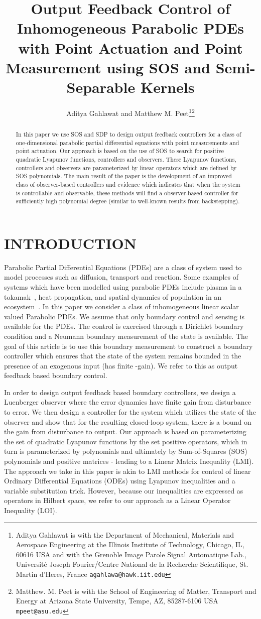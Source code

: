 \documentclass[US letter, 9 pt, conference]{ieeeconf}  \usepackage{setspace}
\title{\LARGE \bf
Output Feedback Control of Inhomogeneous Parabolic PDEs with Point Actuation and Point Measurement using SOS and Semi-Separable Kernels
}
\author{Aditya Gahlawat and Matthew M. Peet\thanks{Aditya Gahlawat is with the Department
of Mechanical, Materials and Aerospace Engineering at the Illinois Institute of Technology, Chicago,
IL, 60616 USA and with the Grenoble Image Parole Signal Automatique Lab., Universit\'{e} Joseph Fourier/Centre National de la Recherche Scientifique, St. Martin d'Heres, France
        {\tt\small agahlawa@hawk.iit.edu}}\thanks{Matthew. M. Peet is with the School of Engineering of Matter, Transport and Energy at Arizona State University, Tempe, AZ, 85287-6106 USA
        {\tt\small mpeet@asu.edu}}}
\begin{document}
\maketitle
\thispagestyle{empty}
\pagestyle{empty}


\begin{abstract}
In this paper we use SOS and SDP to design output feedback controllers for a class of one-dimensional parabolic partial differential equations with point measurements and point actuation. Our approach is based on the use of SOS to search for positive quadratic Lyapunov functions, controllers and observers. These Lyapunov functions, controllers and observers are parameterized by linear operators which are defined by SOS polynomials. The main result of the paper is the development of an improved class of observer-based controllers and evidence which indicates that when the system is controllable and observable, these methods will find a observer-based controller for sufficiently high polynomial degree (similar to well-known results from backstepping).
\end{abstract}


\section{INTRODUCTION}

Parabolic Partial Differential Equations (PDEs) are a class of system used to model processes such as diffusion, transport and reaction.  Some examples of systems which have been modelled using parabolic PDEs include plasma in a tokamak~\cite{witrant2007control}, heat propagation, and spatial dynamics of population in an ecosystem~\cite{murray2002mathematical}. In this paper we consider a class of inhomogeneous linear scalar valued Parabolic PDEs. We assume that only boundary control and sensing is available for the PDEs. The control is exercised through a Dirichlet boundary condition and a Neumann boundary measurement of the state is available. The goal of this article is to use this boundary measurement to construct a boundary controller which ensures that the state of the system remains bounded in the presence of an exogenous input (has finite -gain). We refer to this as output feedback based boundary control.

In order to design output feedback based boundary controllers, we design a Luenberger observer where the error dynamics have finite  gain from disturbance to error. We then design a controller for the system which utilizes the state of the observer and show that for the resulting closed-loop system, there is a bound on the  gain from disturbance to output. Our approach is based on parameterizing the set of quadratic Lyapunov functions by the set positive operators, which in turn is parameterized by polynomials and ultimately by Sum-of-Squares (SOS) polynomials and positive matrices - leading to a Linear Matrix Inequality (LMI). The approach we take in this paper is akin to LMI methods for control of linear Ordinary Differential Equations (ODEs) using Lyapunov inequalities and a variable substitution trick. However, because our inequalities are expressed as operators in Hilbert space, we refer to our approach as a Linear Operator Inequality (LOI).
\end{document}
